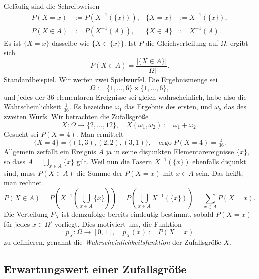 Geläufig sind die Schreibweisen
\begin{align*}
P(X=x) &:= P(X^{-1}(\{x\})), & \{X=x\} &:= X^{-1}(\{x\}),\\
P(X\in A) &:= P(X^{-1}(A)), & \{X\in A\} &:= X^{-1}(A).
\end{align*}
Es ist $\{X=x\}$ dasselbe wie $\{X\in\{x\}\}$. 
Ist $P$ die Gleichverteilung auf $\Omega$, ergibt sich
\[P(X\in A) = \frac{|\{X\in A\}|}{|\Omega|}.\]
Standardbeispiel. Wir werfen zwei Spielwürfel.
Die Ergebnismenge sei%
\[\Omega := \{1,\ldots,6\}\times\{1,\ldots,6\},\]
und jedes der 36 elementaren Ereignisse sei gleich wahrscheinlich, habe
also die Wahrscheinlichkeit $\tfrac{1}{36}$.
Es bezeichne $\omega_1$ das Ergebnis des ersten, und $\omega_2$
das des zweiten Wurfs. Wir betrachten die Zufallsgröße%
\[X\colon\Omega\to\{2,\ldots,12\},\quad
X(\omega_1,\omega_2) := \omega_1+\omega_2.\]
Gesucht sei $P(X=4)$. Man ermittelt
\[\{X=4\} = \{(1,3), (2,2), (3,1)\},\quad\text{ergo}\;P(X=4) = \tfrac{3}{36}.\]
Allgemein zerfällt ein Ereignis $A$ ja in seine disjunkten Elementarereignisse
$\{x\}$, so dass $A = \bigcup_{x\in A} \{x\}$ gilt. Weil nun die
Fasern $X^{-1}(\{x\})$ ebenfalls disjunkt sind, muss $P(X\in A)$ die
Summe der $P(X=x)$ mit $x\in A$ sein. Das heißt, man rechnet%
\[P(X\in A) = P(X^{-1}(\bigcup_{x\in A} \{x\})) = P(\bigcup_{x\in A} X^{-1}(\{x\}))
= \sum_{x\in A} P(X=x).\]
Die Verteilung $P_X$ ist demzufolge bereits eindeutig bestimmt,
sobald $P(X=x)$ für jedes $x\in\Omega'$ vorliegt. Dies motiviert
uns, die Funktion
\[p_X\colon\Omega\to[0,1],\quad p_X(x) := P(X=x)\]
zu definieren, genannt die \emph{Wahrscheinlichkeitsfunktion} der
Zufallsgröße $X$.

\newpage
\subsection{Erwartungswert einer Zufallsgröße}

